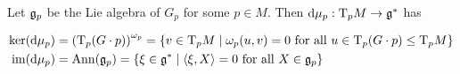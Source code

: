 \documentclass{article}
\newcommand{\red}{\mathrm{red}}
\begin{document}

\begin{proposition}
    Let \(\mathfrak{g}_p\) be the Lie algebra of \(G_p\) for some \(p \in M\). Then \(\dd \mu_p : \mathrm{T} _p M \to \mathfrak{g}^*\) has

    \begin{align*}
        \ker(\dd\mu_p) &= \left(\mathrm{T}_p(G \cdot p)\right)^{\omega_p} = \{v \in \mathrm{T}_p M \mid \omega_p(u, v) = 0 \text{ for all }u \in \mathrm{T}_p(G\cdot p) \le \mathrm{T}_p M\} \\
        \operatorname{im}(\dd\mu_p) &= \operatorname{Ann}(\mathfrak{g}_p) = \{\xi \in \mathfrak{g}^* \mid \left\langle \xi, X \right\rangle = 0 \text{ for all }X \in \mathfrak{g}_p\}
    \end{align*}
\end{proposition}
\end{document}
